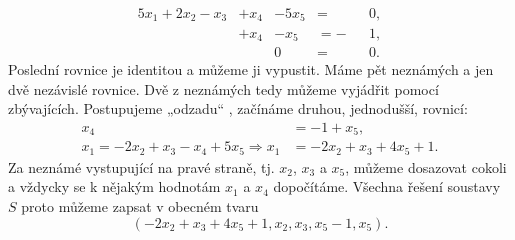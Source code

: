 \begin{example}
  \begin{alignat*}{5}
         x_1 + 2x_2 - x_3 &+  x_4 &- 5x_5 &=  &&0, \\
                          &+  x_4 &-  x_5 &= -&&1, \\
                          &       &     0 &=  &&0.
  \end{alignat*}
  Poslední rovnice je identitou a můžeme ji vypustit. Máme pět neznámých a jen dvě nezávislé 
  rovnice. Dvě z neznámých tedy můžeme vyjádřit pomocí zbývajících. Postupujeme „odzadu“ , začínáme 
  druhou, jednodušší, rovnicí:
  \begin{align*}
                                                x_4 &= -1 + x_5,                \\
    x_1 = - 2x_2 + x_3 - x_4 + 5x_5 \Rightarrow x_1 &= -2x_2 + x_3 + 4x_5 + 1.
  \end{align*}
  Za neznámé vystupující na pravé straně, tj. \(x_2\), \(x_3\) a \(x_5\), můžeme dosazovat cokoli a 
  vždycky se k nějakým hodnotám \(x_1\) a \(x_4\) dopočítáme. Všechna řešení soustavy \(S\) proto 
  můžeme zapsat v obecném tvaru
  \begin{equation}\label{mai:eq040}
    (-2x_2 + x_3 + 4x_5 + 1, x_2, x_3, x_5 - 1, x_5).
  \end{equation}
  \normalsize
\end{example}